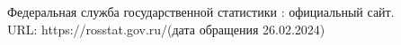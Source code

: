 \begin{thebibliography}{99}
Федеральная служба государственной статистики : официальный
сайт. \\ URL: https://rosstat.gov.ru/(дата обращения 26.02.2024)
\end{thebibliography}






%
